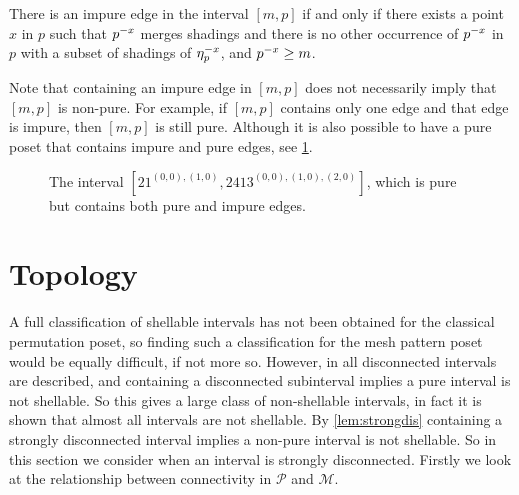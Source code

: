 \documentclass[11pt,a4paper,oneside]{article}
\begin{document}
\begin{cor}
There is an impure edge in the interval $[m,p]$ if and only if there exists a
point $x$ in $p$ such that $\mX{p}{x}$ merges shadings and there is no other
occurrence of $\mX{p}{x}$ in $p$ with a subset of shadings of $\occX{p}{x}$, and
$\mX{p}{x}\ge m$.
\end{cor}

Note that containing an impure edge in $[m,p]$ does not necessarily imply
that $[m,p]$ is non-pure. For example, if $[m,p]$ contains only one edge and
that edge is impure, then $[m,p]$ is still pure. Although it is also possible
to have a pure poset that contains impure and pure edges, see \cref{fig:pureIm}.

\begin{figure}\centering
{}
\caption{The interval $[21^{(0,0),(1,0)},2413^{(0,0),(1,0),(2,0)}]$,
 which is pure but contains both pure and impure edges.}
 \label{fig:pureIm}
\end{figure}

\section{Topology}\label{sec:topology}
A full classification of shellable intervals has not been obtained for the classical permutation
poset, so finding such a classification for the mesh pattern poset would be equally difficult, if not more so.
However, in \cite{McSt13} all disconnected intervals are described, and containing a disconnected subinterval
implies a pure interval is not shellable. So this gives a large class of non-shellable intervals, in fact
it is shown that almost all intervals are not shellable. By \cref{lem:strongdis} containing a strongly
disconnected interval implies a non-pure interval is not shellable. So in this section we consider
when an interval is strongly disconnected. Firstly we look at the relationship between connectivity
in $\mathcal{P}$ and $\mathcal{M}$.
\end{document}
